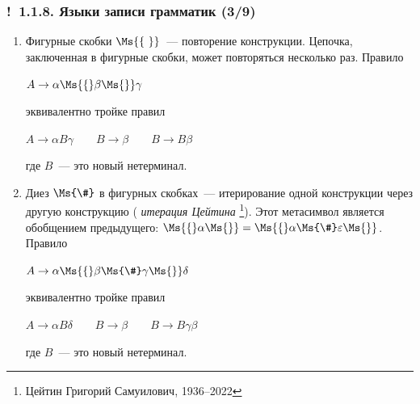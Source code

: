 \documentclass[mathserif,12pt,aspectratio=169]{beamer}
\renewcommand{\index}[1]{}
\def\odmkey#1#2{{\it\color{red} #1}\index{#2}}
\def\Ok{{\color{green}\textbf{!}\ }}
\begin{document}
\begin{frame}
\frametitle{\Ok 1.1.8. Языки записи грамматик (3/9)}
\begin{enumerate}
\item[4.] Фигурные скобки $\Ms{\{\ \}}$~--- повторение конструкции.
Цепочка, заключенная в фигурные скобки, может повторяться
несколько раз. Правило

\begin{center}
$
A\rightarrow \alpha\Ms{\{}\beta\Ms{\}}\gamma
$
\end{center}

эквивалентно тройке правил

\begin{center}
$
A\rightarrow \alpha B\gamma \qquad B\rightarrow\beta  \qquad B\rightarrow B \beta
$
\end{center}

где $B$~--- это новый нетерминал.

\item[5.] Диез $\Ms{\#}$ в фигурных скобках~--- итерирование одной конструкции через другую конструкцию (\odmkey{итерация Цейтина}{Итерация!Цейтина}
\footnote{Цейтин Григорий Самуилович, 1936--2022}).
Этот метасимвол является обобщением предыдущего:
$\Ms{\{}\alpha\Ms{\}}=\Ms{\{}\alpha\Ms{\#}\varepsilon\Ms{\}}$. Правило

\begin{center}
$
A\rightarrow \alpha\Ms{\{}\beta\Ms{\#}\gamma\Ms{\}}\delta
$
\end{center}

эквивалентно тройке правил

\begin{center}
$
A\rightarrow \alpha B\delta \qquad B\rightarrow\beta 
\qquad B\rightarrow B
\gamma\beta
$
\end{center}

где $B$~--- это новый нетерминал.
\end{enumerate}

\vspace{4pt}

\end{frame}
\end{document}
